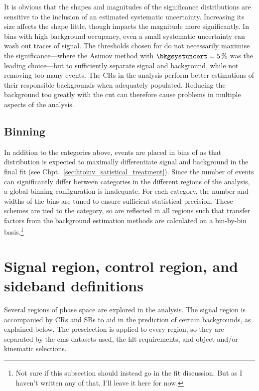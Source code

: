 It is obvious that the shapes and magnitudes of the significance distributions are sensitive to the inclusion of an estimated systematic uncertainty. Increasing its size affects the shape little, though impacts the magnitude more significantly. In bins with high background occupancy, even a small systematic uncertainty can wash out traces of signal. The thresholds chosen for \omegaTilde do not necessarily maximise the significance---where the Asimov method with $\bkgsystuncert = \text{5\,\%}$ was the leading choice---but to sufficiently separate signal and background, while not removing too many events. The \glspl{CR} in the analysis perform better estimations of their responsible backgrounds when adequately populated. Reducing the background too greatly with the \omegaTilde cut can therefore cause problems in multiple aspects of the analysis.




\subsection{Binning}
\label{subsec:htoinv_binning}

In addition to the categories above, events are placed in bins of \ptmiss as that distribution is expected to maximally differentiate signal and background in the final fit (see Chpt.~\ref{sec:htoinv_satistical_treatment}). Since the number of events can significantly differ between categories in the different regions of the analysis, a global binning configuration is inadequate. For each category, the number and widths of the bins are tuned to ensure sufficient statistical precision. These schemes are tied to the category, so are reflected in all regions such that transfer factors from the background estimation methods are calculated on a bin-by-bin basis.\footnote{Not sure if this subsection should instead go in the fit discussion. But as I haven't written any of that, I'll leave it here for now.}




\section{Signal region, control region, and sideband definitions}
\label{sec:region_definitions}

Several regions of phase space are explored in the analysis. The signal region is accompanied by \glspl{CR} and \glspl{SB} to aid in the prediction of certain backgrounds, as explained below. The preselection is applied to every region, so they are separated by the \acrshort{cms} datasets used, the \acrlong{hlt} requirements, and object and/or kinematic selections.

